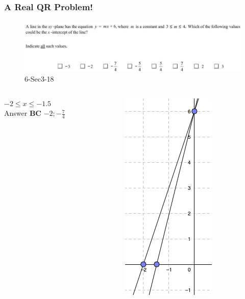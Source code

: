 \documentclass[
	11pt, %
	handout,
]{beamer}
\begin{document}
\begin{frame}
	\frametitle{A Real QR Problem!}
	\framesubtitle{}
	\begin{figure}
		\includegraphics[width=\linewidth]{Graphing_Linear_Equations_Example_Question1.png}
		\caption{6-Sec3-18}
	\end{figure}

	\begin{columns}[t] 
		\begin{column}{0.45\textwidth} %
			\pause
			$-2\leq x \leq -1.5$\\
			\pause
			\bigskip
			Answer \textbf{BC} $-2;-\frac{7}{4}$ 
		\end{column}
		\begin{column}{0.5\textwidth} %
			\begin{figure}
				\includegraphics[width=0.2\linewidth]{Graphing_Linear_Equations_Example_Question1_1.png}
			\end{figure}
    \end{column}
	\end{columns}
\end{frame}

\end{document}
